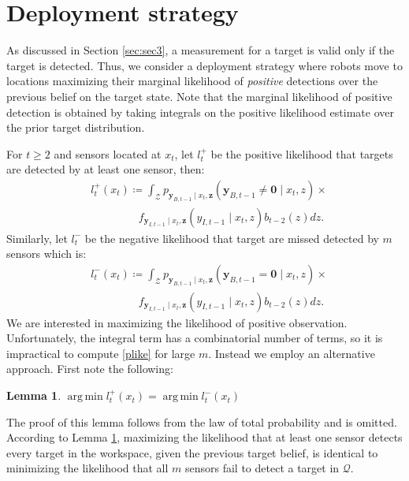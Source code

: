 \documentclass[letterpaper, 10 pt, conference]{ieeeconf}
\newtheorem{lemma}{Lemma}[section]
\DeclareMathOperator*{\argmin}{arg\,min}
\begin{document}
\section{Deployment strategy}
\label{sec:sec5}
As discussed in Section \ref{sec:sec3}, a measurement for a target is valid only if the target is detected. 
Thus, we consider a deployment strategy where robots move to locations maximizing their marginal likelihood of \emph{positive} detections over the previous belief on the target state. 
Note that the marginal likelihood of positive detection is obtained by taking integrals on the positive likelihood estimate over the prior target distribution.

For $t \geq 2$ and sensors located at $x_t$, let $l_t^{+}$ be the positive likelihood that targets are detected by at least one sensor, then:
\begin{align}
&l_t^{+}(x_t)\coloneqq \int_{\mathcal{Z}}
p_{\bm{y}_{B,t-1}\mid x_t,\bm{z}}
\left(
\bm{y}_{B,t-1} \neq \bm{0}
\mid x_t,z
\right) \times \nonumber \\
&\,\,\,\,\,\,\,\,\,\,\,\,\,\,\,\,\,\,\,\,\,\,\,\,\,\,f_{\bm{y}_{I,t-1}\mid x_t,\bm{z}}
\left(
y_{I,t-1}
\mid x_t,z
\right) b_{t-2}(z) dz.
\label{plike}  
\end{align}
Similarly, let $l_t^{-}$ be the negative likelihood that target are missed detected by $m$ sensors which is:
\begin{align}
&l_t^{-}(x_t)\coloneqq \int_{\mathcal{Z}}
p_{\bm{y}_{B,t-1}\mid x_t,\bm{z}}
\left(
\bm{y}_{B,t-1}= \bm{0}\mid x_t,z
\right)
 \times \nonumber \\
&\,\,\,\,\,\,\,\,\,\,\,\,\,\,\,\,\,\,\,\,\,\,\,\,\,\,f_{\bm{y}_{I,t-1}\mid x_t,\bm{z}}
\left(
y_{I,t-1}
\mid x_t,z
\right) b_{t-2}(z)dz. 
\end{align}
We are interested in maximizing the likelihood of positive observation. 
Unfortunately, the integral term has a combinatorial number of terms, so it is impractical to compute \eqref{plike} for large $m$. 
Instead we employ an alternative approach. 
First note the following:
\begin{lemma}
$\argmin l_t^+(x_t) = \argmin l_t^-(x_t)$
\label{lem1}
\end{lemma}
The proof of this lemma follows from the law of total probability and is omitted.
According to Lemma \ref{lem1}, maximizing the likelihood that at least one sensor detects every target in the workspace, given the previous target belief, is identical to minimizing the likelihood that all $m$ sensors fail to detect a target in $\mathcal{Q}$.
\end{document}
